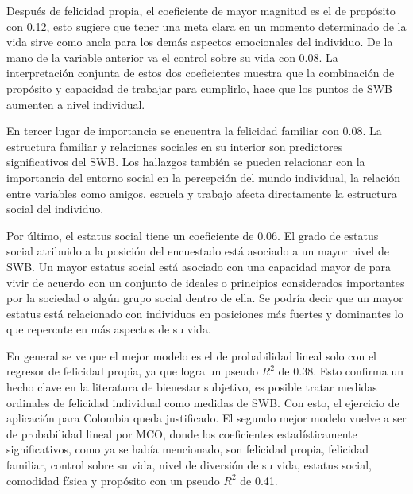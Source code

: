 \documentclass[12pt,spanish]{article}
\begin{document}
Después de felicidad propia, el coeficiente de mayor magnitud es el de propósito con 0.12, esto sugiere que tener una meta clara en un momento determinado de la vida sirve como ancla para los demás aspectos emocionales del individuo. De la mano de la variable anterior va el control sobre su vida con 0.08. La interpretación conjunta de estos dos coeficientes muestra que la combinación de propósito y capacidad de trabajar para cumplirlo, hace que los puntos de SWB aumenten a nivel individual. 

En tercer lugar de importancia se encuentra la felicidad familiar con 0.08. La estructura familiar y relaciones sociales en su interior son predictores significativos del SWB. Los hallazgos también se pueden relacionar con la importancia del entorno social en la percepción del mundo individual, la relación entre variables como amigos, escuela y trabajo afecta directamente la estructura social del individuo. 

Por último, el estatus social tiene un coeficiente de 0.06. El grado de estatus social atribuido a la posición del encuestado está asociado a un mayor nivel de SWB. Un mayor estatus social está asociado con una capacidad mayor de para vivir de acuerdo con un conjunto de ideales o principios considerados importantes por la sociedad o algún grupo social dentro de ella. Se podría decir que un mayor estatus está relacionado con individuos en posiciones más fuertes y dominantes lo que repercute en más aspectos de su vida. 

En general se ve que el mejor modelo es el de probabilidad lineal solo con el regresor de felicidad propia, ya que logra un pseudo $R^2$ de 0.38. Esto confirma un hecho clave en la literatura de bienestar subjetivo, es posible tratar medidas ordinales de felicidad individual como medidas de SWB. Con esto, el ejercicio de aplicación para Colombia queda justificado. El segundo mejor modelo vuelve a ser de probabilidad lineal por MCO, donde los coeficientes estadísticamente significativos, como ya se había mencionado, son felicidad propia, felicidad familiar, control sobre su vida, nivel de diversión de su vida, estatus social, comodidad física y propósito con un pseudo $R^2$ de 0.41. 
\end{document}
